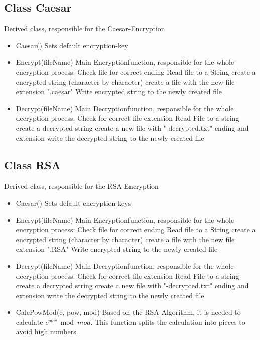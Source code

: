\subsection{Class Caesar}
Derived class, responsible for the Caesar-Encryption
\begin{itemize}
	\item Caesar()
	\subitem Sets default encryption-key
	
	\item Encrypt(fileName)
	\subitem Main Encryptionfunction, responsible for the whole encryption process:
	\subsubitem Check file for correct ending
	\subsubitem Read file to a String
	\subsubitem create a encrypted string (character by character)
	\subsubitem create a file with the new file extension ".caesar" 
	\subsubitem Write encrypted string to the newly created file
	
	\item Decrypt(fileName)
	\subitem Main Decryptionfunction, responsible for the whole decryption process:
	\subsubitem Check for correct file extension
	\subsubitem Read File to a string
	\subsubitem create a decrypted string
	\subsubitem create a new file with "-decrypted.txt" ending and extension
	\subsubitem write the decrypted string to the newly created file
\end{itemize}
\subsection{Class RSA}
Derived class, responsible for the RSA-Encryption
\begin{itemize}
	\item Caesar()
	\subitem Sets default encryption-keys
	
	\item Encrypt(fileName)
	\subitem Main Encryptionfunction, responsible for the whole encryption process:
	\subsubitem Check file for correct ending
	\subsubitem Read file to a String
	\subsubitem create a encrypted string (character by character)
	\subsubitem create a file with the new file extension ".RSA" 
	\subsubitem Write encrypted string to the newly created file
	
	\item Decrypt(fileName)
	\subitem Main Decryptionfunction, responsible for the whole decryption process:
	\subsubitem Check for correct file extension
	\subsubitem Read File to a string
	\subsubitem create a decrypted string
	\subsubitem create a new file with "-decrypted.txt" ending and extension
	\subsubitem write the decrypted string to the newly created file
	
	\item CalcPowMod(c, pow, mod)
	\subitem Based on the RSA Algorithm, it is needed to calculate \(c^{pow} \bmod mod\). This function splits the calculation into pieces to avoid high numbers.
\end{itemize}

